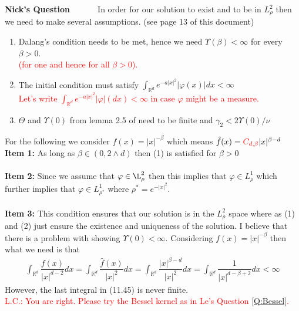 \documentclass[a4paper,11pt]{article}
\theoremstyle{plain}
\theoremstyle{definition}
\newcommand{\R}{\mathbb{R}}
\newcounter{NQ}
\newenvironment{NickQuestion}[1][] %
  {\refstepcounter{NQ}
  \begin{mdframed}[backgroundcolor=lightgray]\textbf{Nick's Question \theNQ \: #1~~}~~~\noindent}%
  {\end{mdframed}}
\numberwithin{NQ}{section}
\numberwithin{LQ}{section}
\numberwithin{ZQ}{section}
\begin{document}
\begin{NickQuestion}
In order for our solution to exist and to be in $L_\rho^2$ then we need to make several assumptions. (see page 13 of this document)
\begin{enumerate}
    \item Dalang's condition needs to be met, hence we need $\Upsilon(\beta)<\infty$ for every $\beta >0$. \\
    \textcolor{red}{(for one and hence for all $\beta>0$).}
    \item The initial condition must satisfy $\int_{\R^d}e^{-a|x|^2}|\varphi(x)|dx <\infty$ \\
    \textcolor{red}{Let's write $\int_{\R^d}e^{-a|x|^2}|\varphi|(dx) <\infty$ in case $\varphi$ might be a measure.}
    \item $\Theta$ and $\Upsilon(0)$ from lemma 2.5 of \cite{CH16Comparison} need to be finite and $\gamma_2<2\Upsilon(0)/\nu$
\end{enumerate} 

For the following we consider $f(x)=|x|^{-\beta}$ which means $\hat f(x)=\textcolor{red}{C_{d,\beta}}|x|^{\beta-d}$ \\
\textbf{Item 1:} As long as $\beta \in (0,2\wedge d)$ then (1) is satisfied for $\beta >0$ \\ \\
\textbf{Item 2:} Since we assume that $\varphi \in \L_\rho^2$ then this implies that $\varphi \in L_\rho ^1$ which further implies that $\varphi \in L_{\rho^*}^1$ where $\rho^*=e^{-|x|^2}$. \\ \\
\textbf{Item 3:} This condition ensures that our solution is in the $L_\rho^2$ space where as (1) and (2) just ensure the existence and uniqueness of the solution. I believe that there is a problem with showing $\Upsilon(0)<\infty$. Considering $f(x)=|x|^{-\beta}$ then what we need is that \begin{align}
    \int_{\R^d}\dfrac{f(x)}{|x|^{d-2}}dx = \int_{\R^d}\dfrac{\hat f(x)}{|x|^{2}}dx = \int_{\R^d}\dfrac{|x|^{\beta-d}}{|x|^2}dx  = \int_{\R^d}\dfrac{1}{|x|^{d-\beta +2}}dx <\infty
\end{align}
However, the last integral in (11.45) is never finite. \\[1em]
\textcolor{red}{L.C.: You are right. Please try the Bessel kernel as in Le's Question \ref{Q:Bessel}.}
\end{NickQuestion}
\end{document}
